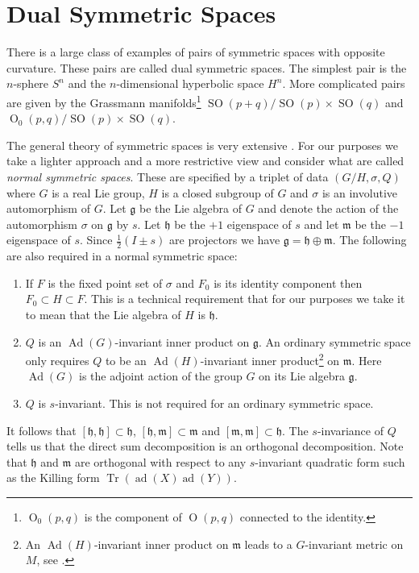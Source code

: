 \documentclass[a4paper,12pt]{article}
\DeclareMathOperator{\Tr}{Tr}
\DeclareMathOperator{\Orth}{O}
\DeclareMathOperator{\SOrth}{SO}
\DeclareMathOperator{\Ad}{Ad}
\DeclareMathOperator{\ad}{ad}
\newcommand{\lieg}{\mathfrak{g}}
\newcommand{\lieh}{\mathfrak{h}}
\newcommand{\liem}{\mathfrak{m}}
\newcommand{\half}{\frac{1}{2}}
\begin{document}
\section{Dual Symmetric Spaces}
\label{sec:dualsym}

There is a large class of examples of pairs of symmetric spaces with
opposite curvature.  These pairs are called dual symmetric
spaces.  The simplest pair is the $n$-sphere $S^{n}$ and the
$n$-dimensional hyperbolic space $H^{n}$.  More complicated pairs are
given by the Grassmann manifolds\footnote{$\Orth_{0}(p,q)$ is the
component of $\Orth(p,q)$ connected to the identity.}
$\SOrth(p+q)/\SOrth(p)\times\SOrth(q)$ and
$\Orth_{0}(p,q)/\SOrth(p)\times\SOrth(q)$.

The general theory of symmetric spaces is very extensive
\cite{Helgason:DG,Wolf:CC}.  For our purposes we take a lighter
approach \cite[Chapter 11]{ONeill:SRG} and a more restrictive view and
consider what are called \emph{normal symmetric spaces}.  These are
specified by a triplet of data $(G/H,\sigma,Q)$ where $G$ is a real
Lie group, $H$ is a closed subgroup of $G$ and $\sigma$ is an
involutive automorphism of $G$.  Let $\lieg$ be the Lie algebra of $G$
and denote the action of the automorphism $\sigma$ on $\lieg$ by $s$. 
Let $\lieh$ be the $+1$ eigenspace of $s$ and let $\liem$ be the $-1$
eigenspace of $s$.  Since $\half(I \pm s)$ are projectors we have
$\lieg=\lieh \oplus \liem$.  The following are also required in a 
normal symmetric space:
\begin{enumerate}
    \item If $F$ is the fixed point set of $\sigma$ and $F_{0}$ is its
    identity component then $F_{0}\subset H\subset F$.  This is a
    technical requirement that for our purposes we take it to mean
    that the Lie algebra of $H$ is $\lieh$.

    \item $Q$ is an $\Ad(G)$-invariant inner product on $\lieg$.  An
    ordinary symmetric space only requires $Q$ to be an
    $\Ad(H)$-invariant inner product\footnote{An $\Ad(H)$-invariant
    inner product on $\liem$ leads to a $G$-invariant metric on $M$, 
    see \cite[p. 312]{ONeill:SRG}.}
    on $\liem$.  Here $\Ad(G)$ is the adjoint action of the group $G$
    on its Lie algebra $\lieg$.
    
    \item $Q$ is $s$-invariant. This is not required for an 
    ordinary symmetric space.
\end{enumerate}
It follows that $[\lieh,\lieh]\subset\lieh$,
$[\lieh,\liem]\subset\liem$ and $[\liem,\liem]\subset\lieh$.  The
$s$-invariance of $Q$ tells us that the direct sum decomposition is an
orthogonal decomposition.  Note that $\lieh$ and $\liem$ are
orthogonal with respect to any $s$-invariant quadratic form such as
the Killing form $\Tr(\ad(X)\ad(Y))$.
\end{document}
